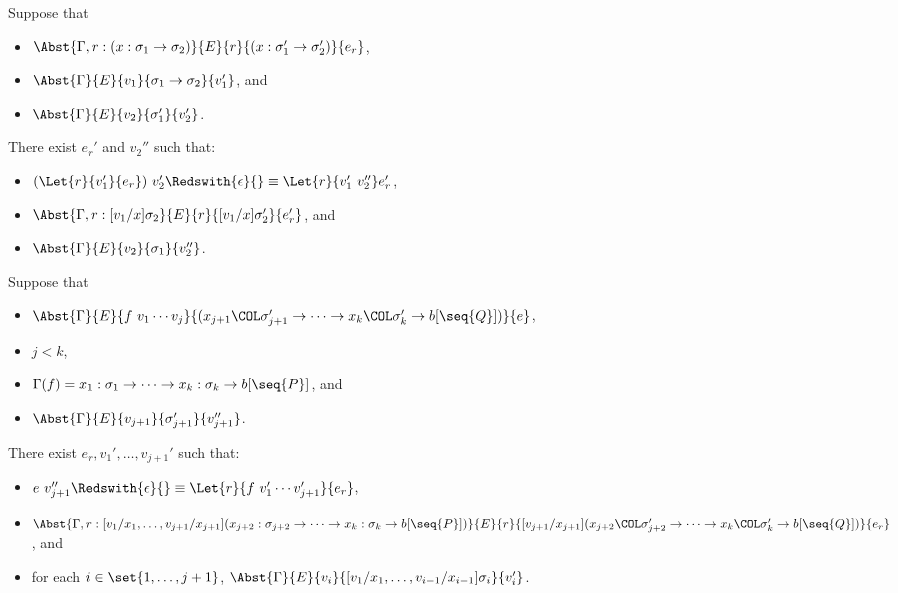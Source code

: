\begin{lemma}
\label{lem:coerce}
Suppose that
\begin{itemize}
\item $\Abst{\Gamma,r:(x:\sigma_1 \to \sigma_2)}{E}{r}{(x:\sigma_1' \to \sigma_2')}{e_r}$,
\item $\Abst{\Gamma}{E}{v_1}{\sigma_1 \to \sigma_2}{v_1'}$, and
\item $\Abst{\Gamma}{E}{v_2}{\sigma_1'}{v_2'}$.
\end{itemize}
There exist $e_r'$ and $v_2''$ such that:
\begin{itemize}
\item $(\Let{r}{v_1'}{e_r})\ v_2' \Redswith{\epsilon}{}\equiv \Let{r}{v_1'\ v_2''}e_r'$,
\item $\Abst{\Gamma,r:[v_1/x]\sigma_2}{E}{r}{[v_1/x]\sigma_2'}{e_r'}$, and
\item $\Abst{\Gamma}{E}{v_2}{\sigma_1}{v_2''}$.
\end{itemize}
\end{lemma}

\begin{lemma}
\label{lem:fun}
Suppose that
\begin{itemize}
\item $\Abst{\Gamma}{E}{f\ v_1\cdots v_j}{(x_{j+1}\COL\sigma_{j+1}' \to \cdots \to x_k\COL\sigma_k' \to b[\seq{Q}])}{e}$,
\item $j<k$,
\item $\Gamma(f)=x_1:\sigma_1 \to \cdots \to x_k:\sigma_k \to b[\seq{P}]$, and
\item $\Abst{\Gamma}{E}{v_{j+1}}{\sigma_{j+1}'}{v_{j+1}''}$.
\end{itemize}
There exist $e_r,v_1',\dots,v_{j+1}'$ such that:
\begin{itemize}
\item $e\ v_{j+1}'' \Redswith{\epsilon}{}\equiv \Let{r}{f\ v_1'\cdots v_{j+1}'}{e_r}$,
\item
$\Abst{\Gamma,r:[v_1/x_1,\dots,v_{j+1}/x_{j+1}](x_{j+2}:\sigma_{j+2} \to \cdots \to x_k:\sigma_k \to b[\seq{P}])}{E}
    {r}
    {[v_{j+1}/x_{j+1}](x_{j+2}\COL\sigma_{j+2}' \to \cdots \to x_k\COL\sigma_k' \to b[\seq{Q}])}
    {e_r}$, and
\item for each $i \in \set{1,\dots,j+1}$, $\Abst{\Gamma}{E}{v_i}{[v_1/x_1,\dots,v_{i-1}/x_{i-1}]\sigma_i}{v_i'}$.
\end{itemize}
\end{lemma}

